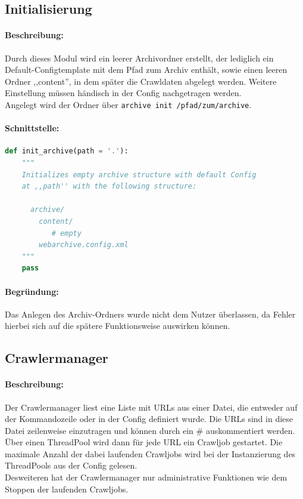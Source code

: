 
\subsection{Initialisierung} 
\label{sub:initialisierung}
\paragraph{Beschreibung:}
\label{par:beschreibung}
Durch dieses Modul wird ein leerer Archivordner erstellt, der lediglich
ein Default-Configtemplate mit dem Pfad zum Archiv enthält, sowie einen leeren Ordner ,,content'',
in dem später die Crawldaten abgelegt werden.
Weitere Einstellung müssen händisch in der Config nachgetragen werden.
\\
Angelegt wird der Ordner über \texttt{archive init /pfad/zum/archive}.
\paragraph{Schnittstelle:}
\label{par:schnittstelle}
\begin{lstlisting}[language=python]
def init_archive(path = '.'):
    """
    Initializes empty archive structure with default Config
    at ,,path'' with the following structure:

      archive/
        content/ 
           # empty
        webarchive.config.xml
    """
    pass
\end{lstlisting}

\paragraph{Begründung:}
\label{par:begr_ndung_}
Das Anlegen des Archiv-Ordners wurde nicht dem Nutzer überlassen, da
Fehler hierbei sich auf die spätere Funktionsweise auswirken können.


\subsection{Crawlermanager}
\label{sub:crawlermanager}
\paragraph{Beschreibung:}
\label{par:beschreibung_}
Der Crawlermanager liest eine Liste mit URLs aus einer Datei, die entweder auf der Kommandozeile oder in
der Config definiert wurde. Die URLs sind in diese Datei zeilenweise einzutragen und können durch ein \# auskommentiert werden.
Über einen ThreadPool wird dann für jede URL ein Crawljob gestartet. Die maximale Anzahl der dabei laufenden Crawljobs wird bei
der Instanzierung des ThreadPools aus der Config gelesen.
\\
Desweiteren hat der Crawlermanager nur administrative Funktionen wie dem Stoppen der laufenden Crawljobs.
